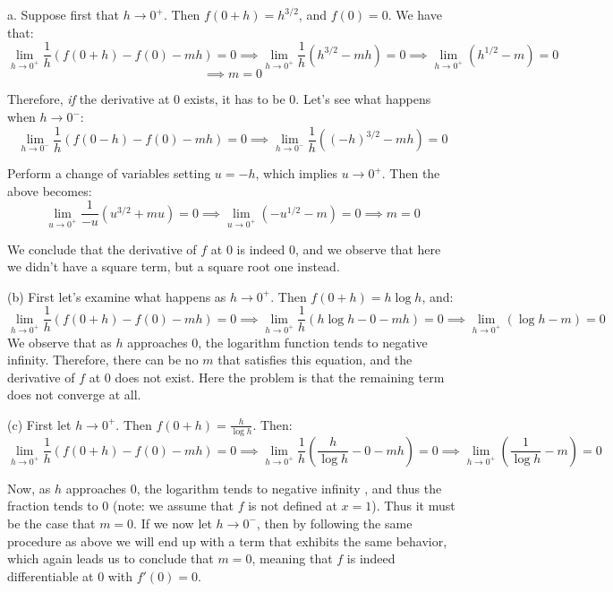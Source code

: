 \begin{solution}

    a. Suppose first that $h \rightarrow 0^{+}$. Then $f(0+h) = h^{3/2}$, and $f(0) = 0$. We have that:
    $$\lim_{h \rightarrow 0^+} \frac{1}{h}(f(0+h) - f(0) - m h) = 0 \implies \lim_{h \rightarrow 0^+} \frac{1}{h}(h^{3/2} - mh) = 0 \implies \lim_{h \rightarrow 0^+}(h^{1/2} - m) = 0$$
    $$\implies m = 0$$

    Therefore, \textit{if} the derivative at 0 exists, it has to be 0. Let's see what happens when $h \rightarrow 0^{-}$:
    $$\lim_{h \rightarrow 0^-} \frac{1}{h}(f(0-h) - f(0) - m h) = 0 \implies \lim_{h \rightarrow 0^-} \frac{1}{h}((-h)^{3/2} - mh) = 0$$

    Perform a change of variables setting $u = -h$, which implies $u \rightarrow 0^{+}$. Then the above becomes:
    $$\lim_{u \rightarrow 0^{+}} \frac{1}{-u}(u^{3/2} + mu) = 0 \implies \lim_{u \rightarrow 0^{+}} (-u^{1/2} - m) = 0 \implies m = 0$$

    We conclude that the derivative of $f$ at 0 is indeed 0, and we observe that here we didn't have a square term, but a square root one instead.

    (b) First let's examine what happens as $h \rightarrow 0^+$. Then $f(0+h) = h \log h$, and:
    $$\lim_{h \rightarrow 0^+} \frac{1}{h}(f(0+h) - f(0) - mh) = 0 \implies \lim_{h \rightarrow 0^+} \frac{1}{h}(h\log h - 0 - mh) = 0 \implies \lim_{h \rightarrow 0^+} (\log h - m) = 0$$
    We observe that as $h$ approaches 0, the logarithm function tends to negative infinity. Therefore, there can be no $m$ that satisfies this equation, and the derivative of $f$ at 0 does not exist. Here the problem is that the remaining term does not converge at all.

    (c) First let $h \rightarrow 0^+$. Then $f(0+h) = \frac{h}{\log h}$. Then:
    $$\lim_{h \rightarrow 0^+} \frac{1}{h}(f(0+h) - f(0) - mh) = 0 \implies \lim_{h \rightarrow 0^+} \frac{1}{h}(\frac{h}{\log h} - 0 - mh) = 0 \implies \lim_{h \rightarrow 0^+} (\frac{1}{\log h} - m) = 0$$

    Now, as $h$ approaches 0, the logarithm tends to negative infinity , and thus the fraction tends to 0 (note: we assume that $f$ is not defined at $x = 1$). Thus it must be the case that $m = 0$. If we now let $h \rightarrow 0^-$, then  by following the same procedure as above we will end up with a term that exhibits the same behavior, which again leads us to conclude that $m = 0$, meaning that $f$ is indeed differentiable at 0 with $f'(0) = 0$.
    
\end{solution}

